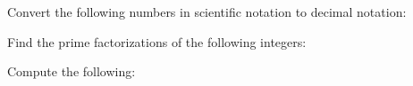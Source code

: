 \documentclass[12pt,letterpaper]{exam}
\begin{document}
\begin{questions}
 \vfill



\question[4] Convert the following numbers in scientific notation to decimal notation: \pspace
{}



\newpage



\question[6] Find the prime factorizations of the following integers: \pspace
{}



\question[8] Compute the following: \pspace
{}
\end{questions}
\end{document}

